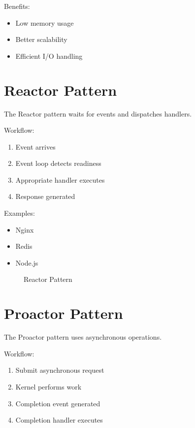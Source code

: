 Benefits:

\begin{itemize}
\item Low memory usage
\item Better scalability
\item Efficient I/O handling
\end{itemize}

\section{Reactor Pattern}

The Reactor pattern waits for events and dispatches handlers.

Workflow:

\begin{enumerate}
\item Event arrives
\item Event loop detects readiness
\item Appropriate handler executes
\item Response generated
\end{enumerate}

Examples:

\begin{itemize}
\item Nginx
\item Redis
\item Node.js
\end{itemize}

\begin{figure}[H]
\centering
{}
\caption{Reactor Pattern}
\end{figure}

\section{Proactor Pattern}

The Proactor pattern uses asynchronous operations.

Workflow:

\begin{enumerate}
\item Submit asynchronous request
\item Kernel performs work
\item Completion event generated
\item Completion handler executes
\end{enumerate}

